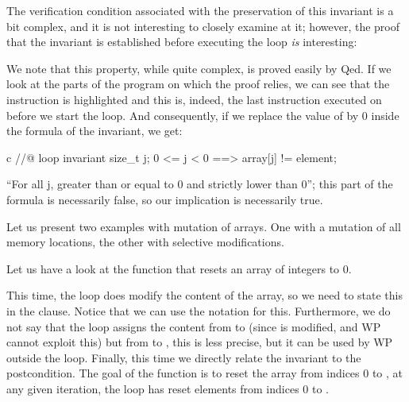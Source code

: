 The verification condition associated with the preservation of this invariant is
a bit complex, and it is not interesting to closely examine at it;
however, the proof that the invariant is established before
executing the loop \emph{is} interesting:




We note that this property, while quite complex, is proved easily
by Qed. If we look at the parts of the program on which the proof
relies, we can see that the instruction  is highlighted
and this is, indeed, the last instruction executed on  before
we start the loop. And consequently, if we replace the value of
 by 0 inside the formula of the invariant, we get:


\begin{CodeBlock}{c}
//@ loop invariant \forall size_t j; 0 <= j < 0 ==> array[j] != element;
\end{CodeBlock}


``For all j, greater than or equal to 0 and strictly lower than 0''; this
part of the formula is necessarily false, so our implication is 
necessarily true.




Let us present two examples with mutation of arrays. One with a mutation
of all memory locations, the other with selective modifications.




Let us have a look at the function that resets an array of integers to 0.




This time, the loop does modify the content of the array, so we need to
state this in the  clause. Notice that we can use
the notation  for this. Furthermore, we do not say that
the loop assigns the content from  to  (since
 is modified, and WP cannot exploit this) but from 
to , this is less precise, but it can be used by WP outside the
loop. Finally, this time we directly relate the invariant to the postcondition.
The goal of the function is to reset the array from indices 0 to , at
any given iteration, the loop has reset elements from indices 0 to .


\label{l4:statements-loops-ex-search-and-replace}


